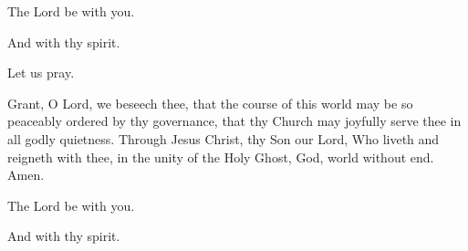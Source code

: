 

\rubric{\Vbar}The Lord be with you.

\rubric{\Rbar}And with thy spirit.

Let us pray.

Grant, O Lord, we beseech thee, that the course of this world may be so peaceably ordered by thy governance, that thy Church may joyfully serve thee in all godly quietness.
Through Jesus Christ, thy Son our Lord, Who liveth and reigneth with thee, in the unity of the Holy Ghost, God, world without end. \rubric{\Rbar} Amen.

\rubric{\Vbar}The Lord be with you.

\rubric{\Rbar}And with thy spirit.